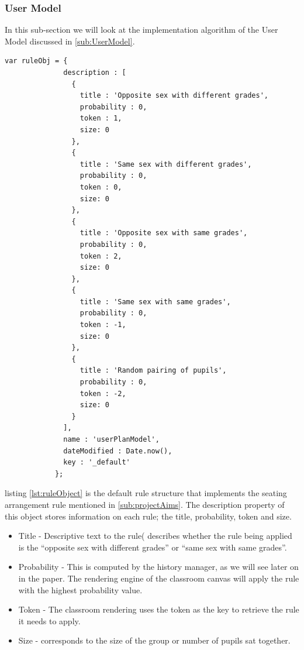 \subsubsection{User Model}
In this sub-section we will look at the implementation algorithm of the User Model discussed in \ref{sub:UserModel}.

\begin{lstlisting}[caption={default rule object}, label={lst:ruleObject}]
                var ruleObj = {
              description : [
                {
                  title : 'Opposite sex with different grades',
                  probability : 0,
                  token : 1,
                  size: 0
                },
                {
                  title : 'Same sex with different grades',
                  probability : 0,
                  token : 0,
                  size: 0
                },
                {
                  title : 'Opposite sex with same grades',
                  probability : 0,
                  token : 2,
                  size: 0
                },
                {
                  title : 'Same sex with same grades',
                  probability : 0,
                  token : -1,
                  size: 0
                },
                {
                  title : 'Random pairing of pupils',
                  probability : 0,
                  token : -2,
                  size: 0
                }
              ],
              name : 'userPlanModel',
              dateModified : Date.now(),
              key : '_default'
            };
\end{lstlisting}
listing \ref{lst:ruleObject} is the default rule structure that implements the seating arrangement rule mentioned in \ref{sub:projectAims}. The description property of this object stores information on each rule; the title, probability, token and size.
\begin{itemize}
    \item Title - Descriptive text to the rule( describes whether the rule being applied is the ``opposite sex with different grades'' or ``same sex with same grades''.
    \item Probability - This is computed by the history manager, as we will see later on in the paper. The rendering engine of the classroom canvas will apply the rule with the highest probability value.
    \item Token - The classroom rendering uses the token as the key to retrieve the rule it needs to apply.
    \item Size - corresponds to the size of the group or number of pupils sat together. 
\end{itemize}
 
